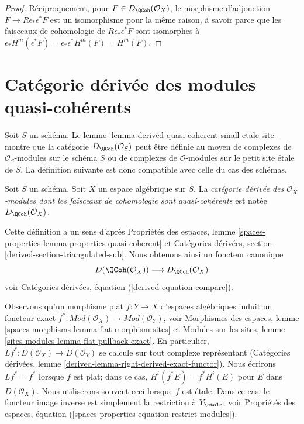 \begin{proof}
\medskip\noindent
Réciproquement, pour $F \in D_\QCoh(\mathcal{O}_X)$, le
morphisme d'adjonction $F \to R\epsilon_*\epsilon^*F$
est un isomorphisme pour la même raison, à savoir parce que
les faisceaux de cohomologie de $R\epsilon_*\epsilon^*F$
sont isomorphes à
$\epsilon_*H^m(\epsilon^*F) = \epsilon_*\epsilon^*H^m(F) = H^m(F)$.
\end{proof}










\section{Catégorie dérivée des modules quasi-cohérents}
\label{section-derived-quasi-coherent}

\noindent
Soit $S$ un schéma. Le lemme
\ref{lemma-derived-quasi-coherent-small-etale-site}
montre que la catégorie $D_\QCoh(\mathcal{O}_S)$ peut être définie
au moyen de complexes de $\mathcal{O}_S$-modules sur le schéma $S$
ou de complexes de $\mathcal{O}$-modules sur le petit site \'etale
de $S$. La définition suivante est donc compatible avec celle
du cas des schémas.

\begin{definition}
\label{definition-derived-quasi-coherent}
Soit $S$ un schéma. Soit $X$ un espace algébrique sur $S$.
La {\it catégorie dérivée des $\mathcal{O}_X$-modules dont les
faisceaux de cohomologie sont quasi-cohérents} est notée
$D_\QCoh(\mathcal{O}_X)$.
\end{definition}

\noindent
Cette définition a un sens d'après
Propriétés des espaces, lemme
\ref{spaces-properties-lemma-properties-quasi-coherent}
et
Catégories dérivées, section \ref{derived-section-triangulated-sub}.
Nous obtenons ainsi un foncteur canonique
\begin{equation}
\label{equation-compare}
D(\QCoh(\mathcal{O}_X))
\longrightarrow
D_\QCoh(\mathcal{O}_X)
\end{equation}
voir Catégories dérivées, équation (\ref{derived-equation-compare}).

\medskip\noindent
Observons qu'un morphisme plat $f : Y \to X$ d'espaces algébriques
induit un foncteur exact
$f^* : \textit{Mod}(\mathcal{O}_X) \to \textit{Mod}(\mathcal{O}_Y)$,
voir
Morphismes des espaces, lemme \ref{spaces-morphisms-lemma-flat-morphism-sites}
et
Modules sur les sites, lemme \ref{sites-modules-lemma-flat-pullback-exact}.
En particulier, $Lf^* : D(\mathcal{O}_X) \to D(\mathcal{O}_Y)$
se calcule sur tout complexe représentant
(Catégories dérivées, lemme \ref{derived-lemma-right-derived-exact-functor}).
Nous écrirons $Lf^* = f^*$ lorsque $f$ est plat; dans ce cas,
$H^i(f^*E) = f^*H^i(E)$ pour $E$ dans $D(\mathcal{O}_X)$.
Nous utiliserons souvent ceci lorsque $f$ est \'etale. Dans ce cas, le
foncteur image inverse est simplement la restriction à $Y_\etale$;
voir Propriétés des espaces, équation
(\ref{spaces-properties-equation-restrict-modules}).

